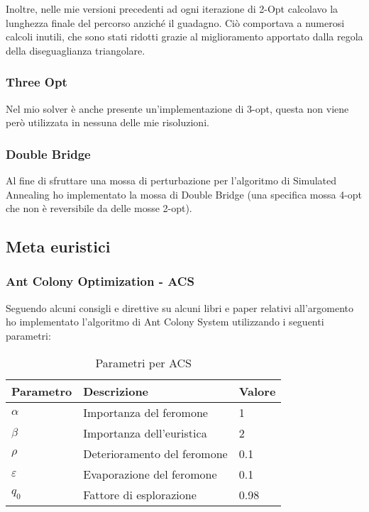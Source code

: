 \documentclass{article}
\begin{document}
Inoltre, nelle mie versioni precedenti ad ogni iterazione
di 2-Opt calcolavo la lunghezza finale del percorso anziché il guadagno. Ciò comportava
a numerosi calcoli inutili, che sono stati ridotti grazie al miglioramento apportato
dalla regola della diseguaglianza triangolare.

\subsubsection{Three Opt}
Nel mio solver è anche presente un'implementazione di 3-opt,
questa non viene però utilizzata in nessuna delle mie risoluzioni.

\subsubsection{Double Bridge}
Al fine di sfruttare una mossa di perturbazione per l'algoritmo di Simulated Annealing
ho implementato la mossa di Double Bridge (una specifica mossa 4-opt che non è reversibile
da delle mosse 2-opt).

\subsection{Meta euristici}
\subsubsection{Ant Colony Optimization - ACS}
Seguendo alcuni consigli e direttive su alcuni libri e paper relativi all'argomento
\cite{aco} \cite{aco-paper} ho implementato l'algoritmo di Ant Colony System utilizzando i seguenti parametri:

\begin{table}
    \begin{center}
        \begin{tabular}{|l|l|l|}
            \hline
            Parametro & Descrizione & Valore \\
            \hline
            $\alpha$      & Importanza del feromone &  1    \\
            $\beta$       & Importanza dell'euristica & 2    \\
            $\rho$        & Deterioramento del feromone & 0.1  \\
            $\varepsilon$ & Evaporazione del feromone & 0.1  \\
            $q_0$         & Fattore di esplorazione & 0.98 \\
            \hline
        \end{tabular}
    \end{center}
    \caption{Parametri per ACS}
\end{table}
\end{document}
